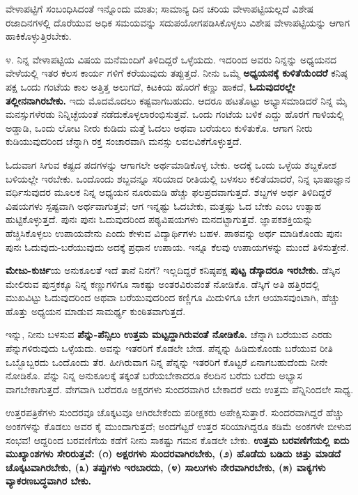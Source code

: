 ವೇಳಾಪಟ್ಟಿಗೆ ಸಂಬಂಧಿಸಿದಂತೆ ಇನ್ನೊಂದು ಮಾತು; ಸಾಮಾನ್ಯ ದಿನ ಚರಿಯ ವೇಳಾಪಟ್ಟಿಯಲ್ಲದೆ ವಿಶೇಷ ರಜಾದಿನಗಳಲ್ಲಿ ದೊರೆಯುವ ಅಧಿಕ ಸಮಯವನ್ನು ಸದುಪಯೋಗಪಡಿಸಿಕೊಳ್ಳಲು ವಿಶೇಷ ವೇಳಾಪಟ್ಟಿಯನ್ನು ಆಗಾಗ ಹಾಕಿಕೊಳ್ಳುತ್ತಿರಬೇಕು.

೪. ನಿನ್ನ ವೇಳಾಪಟ್ಟಿಯ ವಿಷಯ ಮನೆಮಂದಿಗೆ ತಿಳಿದಿದ್ದರೆ ಒಳ್ಳೆಯದು. ಇದರಿಂದ ಅವರು ನಿನ್ನನ್ನು ಅಧ್ಯಯನದ ವೇಳೆಯಲ್ಲಿ ಇತರ ಕೆಲಸ ಕಾರ್ಯ ಗಳಿಗೆ ಕರೆಯುವುದು ತಪ್ಪುತ್ತದೆ. ನೀನು ಒಮ್ಮೆ \textbf{ಅಧ್ಯಯನಕ್ಕೆ ಕುಳಿತೆಯೆಂದರೆ} ಕನಿಷ್ಠ ಪಕ್ಷ ಒಂದು ಗಂಟೆಯ ಕಾಲ ಅತ್ತಿತ್ತ ಅಲುಗದೆ, ಕಿಟಕಿಯ ಹೊರಗೆ ಕಣ್ಣು ಹಾಕದೆ, \textbf{ಓದುವುದರಲ್ಲೇ ತಲ್ಲೀನನಾಗಿರಬೇಕು.} ಇದು ಮೊದಮೊದಲು ಕಷ್ಟವಾಗಬಹುದು. ಆದರೂ ಹಟತೊಟ್ಟು ಅಭ್ಯಾಸಮಾಡಿದರೆ ನಿನ್ನ ಮೈ ಮನಸ್ಸುಗಳೆರಡು ನಿನ್ನಿಚ್ಛೆಯಂತೆ ನಡೆದುಕೊಳ್ಳಲಾರಂಭಿಸುತ್ತವೆ. ಒಂದು ಗಂಟೆಯ ಬಳಿಕ ಎದ್ದು ಹೊರಗೆ ಗಾಳಿಯಲ್ಲಿ ಅಡ್ಡಾಡಿ, ಒಂದು ಲೋಟ ನೀರು ಕುಡಿದು ಮತ್ತೆ ಓದಲು ಅಥವಾ ಬರೆಯಲು ಕುಳಿತುಕೊ. ಆಗಾಗ ನೀರು ಕುಡಿಯುವುದರಿಂದ ಚೆನ್ನಾಗಿ ರಕ್ತ ಸಂಚಾರವಾಗಿ ಮನಸ್ಸು ಲವಲವಿಕೆಗೊಳ್ಳುತ್ತದೆ.

ಓದುವಾಗ ಸಿಗುವ ಕಷ್ಟದ ಪದಗಳನ್ನು ಆಗಾಗಲೇ ಅರ್ಥಮಾಡಿಕೊಳ್ಳ ಬೇಕು. ಅದಕ್ಕೆ ಒಂದು ಒಳ್ಳೆಯ ಶಬ್ದಕೋಶ ಬಳಿಯಲ್ಲೇ ಇರಬೇಕು. ಒಂದೊಂದು ಶಬ್ದವನ್ನೂ ಸರಿಯಾದ ರೀತಿಯಲ್ಲಿ ಬಳಸಲು ಕಲಿತೆಯಾದರೆ, ನಿನ್ನ ಭಾಷಾಜ್ಞಾನ ವರ್ಧಿಸುವುದರ ಮೂಲಕ ನಿನ್ನ ಅಧ್ಯಯನ ನೂರುಮಡಿ ಹೆಚ್ಚು ಫಲಪ್ರದವಾಗುತ್ತದೆ. ಶಬ್ದಗಳ ಅರ್ಥ ತಿಳಿದಿದ್ದರೆ ವಿಷಯಗಳು ಸ್ಪಷ್ಟವಾಗಿ ಅರ್ಥವಾಗುತ್ತವೆ; ಆಗ ಇನ್ನಷ್ಟು ಓದಬೇಕು, ಮತ್ತಷ್ಟು ಓದ ಬೇಕು ಎಂಬ ಉತ್ಸಾಹ ಹುಟ್ಟಿಕೊಳ್ಳುತ್ತದೆ. ಪುನಃ ಪುನಃ ಓದುವುದರಿಂದ ಪಠ್ಯವಿಷಯಗಳು ಮನದಟ್ಟಾಗುತ್ತವೆ. ಜ್ಞಾಪಕಶಕ್ತಿಯನ್ನು ಹೆಚ್ಚಿಸಿಕೊಳ್ಳಲು ಉಪಾಯವೇನು ಎಂದು ಕೇಳುವ ವಿದ್ಯಾರ್ಥಿಗಳು ಬಹಳ. ಪಾಠವನ್ನು ಅರ್ಥ ಮಾಡಿಕೊಂಡು ಪುನಃ ಪುನಃ ಓದುವುದು-ಬರೆಯುವುದು ಅದಕ್ಕೆ ಪ್ರಧಾನ ಉಪಾಯ. ಇನ್ನೂ ಕೆಲವು ಉಪಾಯಗಳನ್ನು ಮುಂದೆ ತಿಳಿಸುತ್ತೇನೆ.

\textbf{ಮೇಜು-ಕುರ್ಚಿ}ಯ ಅನುಕೂಲತೆ ಇದೆ ತಾನೆ ನಿನಗೆ? ಇಲ್ಲದಿದ್ದರೆ ಕನಿಷ್ಠಪಕ್ಷ \textbf{ಪುಟ್ಟ ಡೆಸ್ಕಾದರೂ ಇರಬೇಕು.} ಡೆಸ್ಕಿನ ಮೇಲಿರುವ ಪುಸ್ತಕಕ್ಕೂ ನಿನ್ನ ಕಣ್ಣುಗಳಿಗೂ ಸಾಕಷ್ಟು ಅಂತರವಿರುವಂತೆ ನೋಡಿಕೊ. ಡೆಸ್ಕಿಗೆ ಅತಿ ಹತ್ತಿರದಲ್ಲಿ ಮುಖವಿಟ್ಟು ಓದುವುದರಿಂದ ಅಥವಾ ಬರೆಯುವುದರಿಂದ ಕಣ್ಣಿಗೂ ಮಿದುಳಿಗೂ ಬೇಗ ಆಯಾಸವುಂಟಾಗಿ, ಹೆಚ್ಚು ಹೊತ್ತು ಅಧ್ಯಯನ ಮಾಡುವ ಸಾಮರ್ಥ್ಯ ಕುಂಠಿತವಾಗುತ್ತದೆ.

ಇನ್ನು, ನೀನು ಬಳಸುವ \textbf{ಪೆನ್ನು-ಪೆನ್ಸಿಲು ಉತ್ತಮ ಮಟ್ಟದ್ದಾಗಿರುವಂತೆ ನೋಡಿಕೊ.} ಚೆನ್ನಾಗಿ ಬರೆಯುವ ಎರಡು ಪೆನ್ನುಗಳಿರುವುದು ಒಳ್ಳೆಯದು. ಅವನ್ನು ಇತರರಿಗೆ ಕೊಡಲೇ ಬೇಡ. ಪೆನ್ನನ್ನು ಹಿಡಿದುಕೊಂಡು ಬರೆಯುವ ರೀತಿ ಒಬ್ಬೊಬ್ಬರದು ಒಂದೊಂದು ತೆರ. ಹೀಗಿರುವಾಗ ನಿನ್ನ ಪೆನ್ನನ್ನು ಇತರರಿಗೆ ಕೊಟ್ಟರೆ ಏನಾಗಬಹುದೆಂದು ನೀನೇ ನೋಡಿಕೊ. ಪೆನ್ನು ನಿನ್ನ ಅನುಕೂಲಕ್ಕೆ ತಕ್ಕಂತೆ ಬರೆಯಬೇಕಾದರೂ ಕೆಲದಿನ ಬರೆದು ಬರೆದು ಅಭ್ಯಾಸ ವಾಗಬೇಕಾಗುತ್ತದೆ. ವೇಗವಾಗಿ ಬರೆದರೂ ಅಕ್ಷರಗಳು ಸುಂದರವಾಗಿರ ಬೇಕಾದರೆ ಅದು ಉತ್ತಮ ಪೆನ್ನಿನಿಂದಲೇ ಸಾಧ್ಯ.

ಉತ್ತರಪತ್ರಿಕೆಗಳು ಸುಂದರವೂ ಚೊಕ್ಕಟವೂ ಆಗಿರಬೇಕೆಂದು ಪರೀಕ್ಷಕರು ಅಪೇಕ್ಷಿಸುತ್ತಾರೆ. ಸುಂದರವಾಗಿದ್ದರೆ ಹೆಚ್ಚು ಅಂಕಗಳನ್ನು ಕೊಡಲು ಅವರ ಕೈ ಮುಂದಾಗುತ್ತದೆ; ಅಂದಗೆಟ್ಟರೆ ಉತ್ತರ ಸರಿಯಾಗಿದ್ದರೂ ಕಡಿಮೆ ಅಂಕಗಳೇ ಬೀಳುವ ಸಂಭವ! ಆದ್ದರಿಂದ ಬರವಣಿಗೆಯ ಕಡೆಗೆ ನೀನು ಸಾಕಷ್ಟು ಗಮನ ಕೊಡಲೇ ಬೇಕು. \textbf{ಉತ್ತಮ ಬರವಣಿಗೆಯಲ್ಲಿ ಐದು ಮುಖ್ಯಾಂಶಗಳು ಸೇರಿರುತ್ತವೆ: (೧) ಅಕ್ಷರಗಳು ಸುಂದರವಾಗಿರಬೇಕು, (೨) ಹೊಡೆದು ಬಡಿದು ಚಿತ್ತು ಮಾಡದೆ ಚೊಕ್ಕಟವಾಗಿರಬೇಕು, (೩) ತಪ್ಪುಗಳು  ಇರಬಾರದು, (೪) ಸಾಲುಗಳು ನೇರವಾಗಿರಬೇಕು, (೫) ವಾಕ್ಯಗಳು ವ್ಯಾಕರಣಬದ್ಧವಾಗಿರ ಬೇಕು.}

